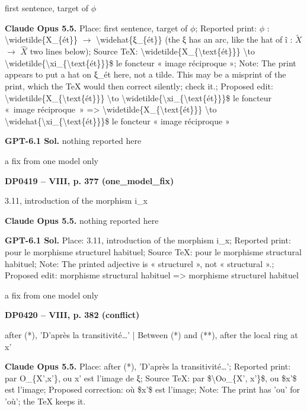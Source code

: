 first sentence, target of \ensuremath{\phi}\par
\textbf{Claude Opus 5.5.} Place: first sentence, target of \ensuremath{\phi}; Reported print: \ensuremath{\phi} : \textbackslash{}widetilde\{X\_\{ét\}\} \ensuremath{\to} \textbackslash{}widehat\{ξ\_\{ét\}\} (the ξ has an arc, like the hat of î : \ensuremath{\tilde{X}} \ensuremath{\to} \ensuremath{\hat{X}} two lines below); Source TeX: \textbackslash{}widetilde\{X\_\{\textbackslash{}text\{ét\}\}\} \textbackslash{}to \textbackslash{}widetilde\{\textbackslash{}xi\_\{\textbackslash{}text\{ét\}\}\}\$ le foncteur « image réciproque »; Note: The print appears to put a hat on ξ\_ét here, not a tilde. This may be a misprint of the print, which the TeX would then correct silently; check it.; Proposed edit: \textbackslash{}widetilde\{X\_\{\textbackslash{}text\{ét\}\}\} \textbackslash{}to \textbackslash{}widetilde\{\textbackslash{}xi\_\{\textbackslash{}text\{ét\}\}\}\$ le foncteur «~image réciproque~» =\allowbreak > \textbackslash{}widetilde\{X\_\{\textbackslash{}text\{ét\}\}\} \textbackslash{}to \textbackslash{}widehat\{\textbackslash{}xi\_\{\textbackslash{}text\{ét\}\}\}\$ le foncteur « image réciproque »\par
\textbf{GPT-6.1 Sol.} nothing reported here\par
a fix from one model only\par
\par\noindent\hypertarget{DP0419}{}\textbf{DP0419 -- VIII, p. 377 (one\_model\_fix)}\par
3.11, introduction of the morphism i\_x\par
\textbf{Claude Opus 5.5.} nothing reported here\par
\textbf{GPT-6.1 Sol.} Place: 3.11, introduction of the morphism i\_x; Reported print: pour le morphisme structurel habituel; Source TeX: pour le morphisme structural habituel; Note: The printed adjective is « structurel », not « structural ».; Proposed edit: morphisme structural habituel =\allowbreak > morphisme structurel habituel\par
a fix from one model only\par
\par\noindent\hypertarget{DP0420}{}\textbf{DP0420 -- VIII, p. 382 (conflict)}\par
after (*), 'D'après la transitivité…' | Between (*) and (**), after the local ring at x'\par
\textbf{Claude Opus 5.5.} Place: after (*), 'D'après la transitivité…'; Reported print: par O\_\{X',x'\}, ou x' est l'image de ξ; Source TeX: par \$\textbackslash{}Oo\_\{X', x'\}\$, ou \$x'\$ est l'image; Proposed correction: où \$x'\$ est l'image; Note: The print has 'ou' for 'où'; the TeX keeps it.\par
